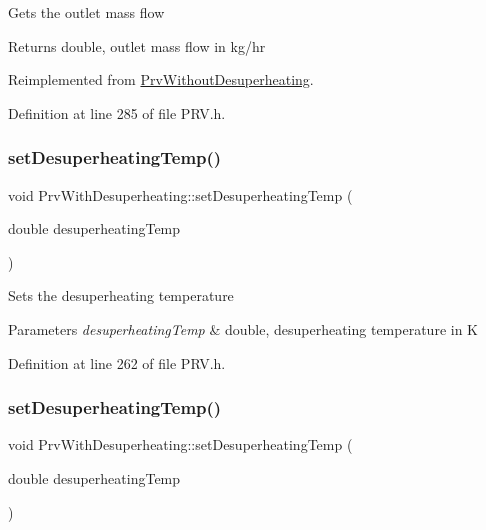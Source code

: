 Gets the outlet mass flow \begin{DoxyReturn}{Returns}
double, outlet mass flow in kg/hr 
\end{DoxyReturn}


Reimplemented from \hyperlink{class_prv_without_desuperheating_aefe4227f2c01209ba4ce79f6b5825d73}{Prv\+Without\+Desuperheating}.



Definition at line 285 of file P\+R\+V.\+h.

\mbox{\label{class_prv_with_desuperheating_ade1b153c495efb451006b3c054ff386e}} 
\subsubsection{\texorpdfstring{set\+Desuperheating\+Temp()}{setDesuperheatingTemp()}\hspace{0.1cm}{\footnotesize\ttfamily [1/3]}}
{\footnotesize\ttfamily void Prv\+With\+Desuperheating\+::set\+Desuperheating\+Temp (\begin{DoxyParamCaption}\item[{double}]{desuperheating\+Temp }\end{DoxyParamCaption})\hspace{0.3cm}{\ttfamily [inline]}}

Sets the desuperheating temperature


\begin{DoxyParams}{Parameters}
{\em desuperheating\+Temp} & double, desuperheating temperature in K \\
\hline
\end{DoxyParams}


Definition at line 262 of file P\+R\+V.\+h.

\mbox{\label{class_prv_with_desuperheating_ade1b153c495efb451006b3c054ff386e}} 
\subsubsection{\texorpdfstring{set\+Desuperheating\+Temp()}{setDesuperheatingTemp()}\hspace{0.1cm}{\footnotesize\ttfamily [2/3]}}
{\footnotesize\ttfamily void Prv\+With\+Desuperheating\+::set\+Desuperheating\+Temp (\begin{DoxyParamCaption}\item[{double}]{desuperheating\+Temp }\end{DoxyParamCaption})\hspace{0.3cm}{\ttfamily [inline]}}

